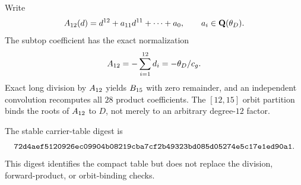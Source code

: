 Write
\[
 A_{12}(d)=d^{12}+a_{11}d^{11}+\cdots+a_0,
 \qquad a_i\in\mathbf Q(\theta_D).
\]
The subtop coefficient has the exact normalization
\begin{equation}
 [d^{11}]\Acarrier=-\sum_{i=1}^{12}d_i=-\theta_D/c_g.
\label{eq:appendix-carrier-subtop}
\end{equation}
Exact long
division by \(A_{12}\) yields \(B_{15}\) with zero remainder, and an
independent convolution recomputes all \(28\) product coefficients.  The
\([12,15]\) orbit partition binds the roots of \(A_{12}\) to \(D\), not
merely to an arbitrary degree-\(12\) factor.

The stable carrier-table digest is
\[
\texttt{72d4aef5120926ec09904b08219cba7cf2b49323bd085d05274e5c17e1ed90a1}.
\]
This digest identifies the compact table but does not replace the division,
forward-product, or orbit-binding checks.
